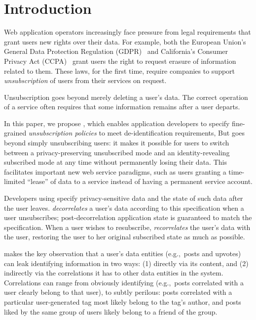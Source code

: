 \section{Introduction}

%
Web application operators increasingly face pressure from legal requirements
that grant users new rights over their data.
%
For example, both the European Union's General Data Protection Regulation
(GDPR)~\cite{eu:gdpr} and California's Consumer Privacy Act
(CCPA)~\cite{ca:privacy-act} grant users the right to request erasure of
information related to them.
%
These laws, for the first time, require companies to support \emph{unsubscription}
of users from their services on request.
%

%
Unsubscription goes beyond merely deleting a user's data.
%
The correct operation of a service often requires that some information
remains after a user departs.
%
%

%
In this paper, we propose \sys{}, which enables application developers to specify
fine-grained \emph{unsubscription policies} to meet de-identification requirements,
%
But \sys{} goes beyond simply unsubscribing users: it makes it possible for users to
switch between a privacy-preserving unsubscribed mode and an
identity-revealing subscribed mode at any time without permanently losing their data.
%
This facilitates important new web service paradigms, such as users granting a
time-limited ``lease'' of data to a service instead of having a permanent service
account.
%

Developers using \sys{} specify privacy-sensitive data and the state of such data after the user
leaves. \sys{} \emph{decorrelates} a user's data according to this specification when a user unsubscribes;
post-decorrelation application state is guaranteed to match the specification.  When a user wishes
to resubscribe, \sys{} \emph{recorrelates} the user's data with the user, restoring the user to her
original subscribed state as much as possible.

\sys{} makes the key observation that a user's data entities (e.g.,\ posts and upvotes) can leak identifying
information in two ways: (1) directly via its content, and (2) indirectly via the correlations it has to
other data entities in the system.
Correlations can range from obviously identifying (e.g.,\ posts correlated
with a user clearly belong to that user), to subtly perilous: posts correlated with a
particular user-generated tag most likely belong to the tag's author, and posts liked by the
same group of users likely belong to a friend of the group.

